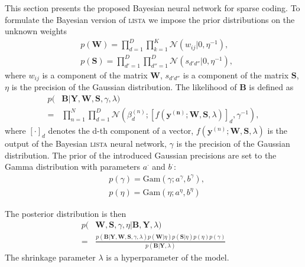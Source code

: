 \documentclass[letterpaper]{article}
\begin{document}
This section presents the proposed Bayesian neural network for sparse coding. To formulate the Bayesian version of \textsc{lista} we impose the prior distributions on the unknown weights
\begin{subequations}
\label{eq:ws}
\begin{align}
&p(\mathbf{W}) = \prod_{d=1}^D\prod_{k=1}^K \mathcal{N}(w_{ij} | 0, \eta^{-1}), \\
&p(\mathbf{S}) = \prod_{d'=1}^D\prod_{d''=1}^D \mathcal{N}(s_{d'd''} | 0, \eta^{-1}),
\end{align}
\end{subequations}
where $w_{ij}$ is a component of the matrix $\mathbf{W}$, $s_{d'd''}$ is a component of the matrix $\mathbf{S}$, $\eta$ is the precision of the Gaussian distribution.
The likelihood of $\mathbf{B}$ is defined as
\begin{align}
p(&\mathbf{B}| \mathbf{Y}, \mathbf{W}, \mathbf{S}, \gamma, \lambda) \nonumber \\
\label{eq:likelihood}
= &\prod_{n=1}^N\prod_{d=1}^D\mathcal{N}(\beta_d^{(n)}; [f(\mathbf{y^{(n)}}; \mathbf{W}, \mathbf{S}, \lambda)]_d, \gamma^{-1}),
\end{align}
where $[\cdot]_d$ denotes the d-th component of a vector, $f(\mathbf{y}^{(n)}; \mathbf{W}, \mathbf{S}, \lambda)$ is the output of the Bayesian \textsc{lista} neural network, $\gamma$ is the precision of the Gaussian distribution.
The prior of the introduced Gaussian precisions are set to the Gamma distribution with parameters $a^{\cdot}$ and $b^{\cdot}$:
\begin{subequations}
\label{eq:gamma_eta}
\begin{align}
&p(\gamma) = \text{Gam}\left(\gamma; a^{\gamma}, b^{\gamma}\right), \\
&p(\eta) = \text{Gam}\left(\eta; 	a^{\eta}, b^{\eta}\right)
\end{align}
\end{subequations}

The posterior distribution is then
\begin{align}
p(&\mathbf{W}, \mathbf{S}, \gamma, \eta | \mathbf{B}, \mathbf{Y}, \lambda) \nonumber \\
\label{eq:posterior}
= & \frac{p(\mathbf{B} | \mathbf{Y}, \mathbf{W},  \mathbf{S}, \gamma, \lambda) p(\mathbf{W} | \eta )p(\mathbf{S} | \eta) p(\eta) p(\gamma)}{p(\mathbf{B} | \mathbf{Y}, \lambda)}
\end{align}
The shrinkage parameter $\lambda$ is a hyperparameter of the model.
\end{document}
